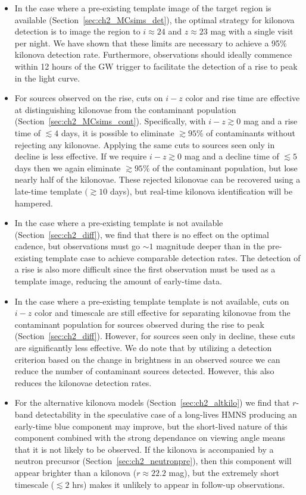 \begin{itemize}
\item In the case where a pre-existing template image of the target region is available (Section~\ref{sec:ch2_MCsims_det}), the optimal strategy for kilonova detection is to image the region to $i\approx 24$ and $z\approx 23$ mag with a single visit per night. We have shown that these limits are necessary to achieve a 95\% kilonova detection rate. Furthermore, observations should ideally commence within 12 hours of the GW trigger to facilitate the detection of a rise to peak in the light curve.
\item For sources observed on the rise, cuts on $i-z$ color and rise time are effective at distinguishing kilonovae from the contaminant population (Section~\ref{sec:ch2_MCsims_cont}). Specifically, with $i-z\gtrsim0$ mag and a rise time of $\lesssim 4$ days, it is possible to eliminate $\gtrsim95\%$ of contaminants without rejecting any kilonovae. Applying the same cuts to sources seen only in decline is less effective. If we require $i-z\gtrsim0$ mag and a decline time of $\lesssim5$ days then we again eliminate $\gtrsim95\%$ of the contaminant population, but lose nearly half of the kilonovae. These rejected kilonovae can be recovered using a late-time template $(\gtrsim10$ days), but real-time kilonova identification will be hampered.
\item In the case where a pre-existing template is not available (Section~\ref{sec:ch2_diff}), we find that there is no effect on the optimal cadence, but observations must go $\sim1$ magnitude deeper than in the pre-existing template case to achieve comparable detection rates. The detection of a rise is also more difficult since the first observation must be used as a template image, reducing the amount of early-time data.
\item In the case where a pre-existing template template is not available, cuts on $i-z$ color and timescale are still effective for separating kilonovae from the contaminant population for sources observed during the rise to peak (Section~\ref{sec:ch2_diff}). However, for sources seen only in decline, these cuts are significantly less effective. We do note that by utilizing a detection criterion based on the change in brightness in an observed source we can reduce the number of contaminant sources detected. However, this also reduces the kilonovae detection rates.
\item For the alternative kilonova models (Section~\ref{sec:ch2_altkilo}) we find that $r$-band detectability in the speculative case of a long-lives HMNS producing an early-time blue component may improve, but the short-lived nature of this component combined with the strong dependance on viewing angle means that it is not likely to be observed. If the kilonova is accompanied by a neutron precursor (Section~\ref{sec:ch2_neutronpre}), then this component will appear brighter than a kilonova ($r\approx22.2$ mag), but the extremely short timescale ($\lesssim2$ hrs) makes it unlikely to appear in follow-up observations.

\end{itemize}
